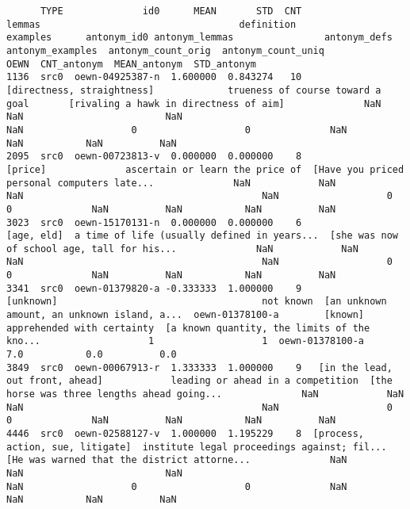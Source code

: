 \documentclass[a4paper,10pt,onecolumn,oneside,openright]{article}
\begin{document}
\begin{verbatim}
      TYPE              id0      MEAN       STD  CNT                            lemmas                                   definition                                     examples      antonym_id0 antonym_lemmas                antonym_defs                             antonym_examples  antonym_count_orig  antonym_count_uniq             OEWN  CNT_antonym  MEAN_antonym  STD_antonym
1136  src0  oewn-04925387-n  1.600000  0.843274   10        [directness, straightness]             trueness of course toward a goal       [rivaling a hawk in directness of aim]              NaN            NaN                         NaN                                          NaN                   0                   0              NaN          NaN           NaN          NaN
2095  src0  oewn-00723813-v  0.000000  0.000000    8                           [price]              ascertain or learn the price of  [Have you priced personal computers late...              NaN            NaN                         NaN                                          NaN                   0                   0              NaN          NaN           NaN          NaN
3023  src0  oewn-15170131-n  0.000000  0.000000    6                        [age, eld]  a time of life (usually defined in years...  [she was now of school age, tall for his...              NaN            NaN                         NaN                                          NaN                   0                   0              NaN          NaN           NaN          NaN
3341  src0  oewn-01379820-a -0.333333  1.000000    9                         [unknown]                                    not known  [an unknown amount, an unknown island, a...  oewn-01378100-a        [known]  apprehended with certainty  [a known quantity, the limits of the kno...                   1                   1  oewn-01378100-a          7.0           0.0          0.0
3849  src0  oewn-00067913-r  1.333333  1.000000    9   [in the lead, out front, ahead]            leading or ahead in a competition  [the horse was three lengths ahead going...              NaN            NaN                         NaN                                          NaN                   0                   0              NaN          NaN           NaN          NaN
4446  src0  oewn-02588127-v  1.000000  1.195229    8  [process, action, sue, litigate]  institute legal proceedings against; fil...  [He was warned that the district attorne...              NaN            NaN                         NaN                                          NaN                   0                   0              NaN          NaN           NaN          NaN

\end{verbatim}
\end{document}
